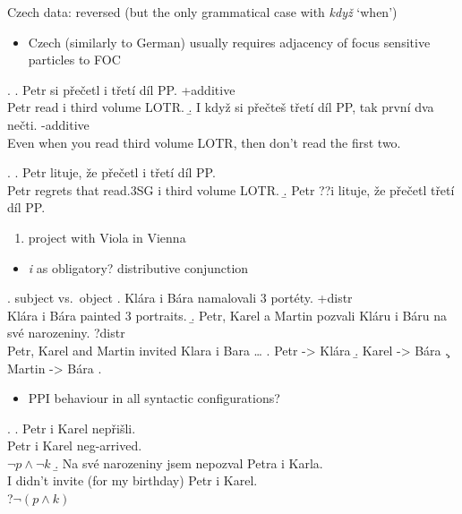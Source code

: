 \documentclass[ignorenonframetext,]{beamer}
\providecommand{\tightlist}{%
  \setlength{\itemsep}{0pt}\setlength{\parskip}{0pt}}
\begin{document}
\begin{frame}

Czech data: reversed (but the only grammatical case with \emph{když}
`when')

\begin{itemize}
\tightlist
\item
  Czech (similarly to German) usually requires adjacency of focus
  sensitive particles to FOC
\end{itemize}

\ex. \a. Petr si přečetl i třetí díl PP. \hfill +additive\\
Petr read i third volume LOTR. \b. I když si přečteš třetí díl PP, tak
první dva nečti. \hfill -additive\\
Even when you read third volume LOTR, then don't read the first two.

\ex. \a. Petr lituje, že přečetl i třetí díl PP.\\
Petr regrets that read.3SG i third volume LOTR. \b. Petr ??i lituje, že
přečetl třetí díl PP.

\end{frame}

\begin{frame}

\begin{enumerate}
\def\labelenumi{\arabic{enumi})}
\setcounter{enumi}{2}
\tightlist
\item
  project with Viola in Vienna
\end{enumerate}

\begin{itemize}
\tightlist
\item
  \emph{i} as obligatory? distributive conjunction
\end{itemize}

\ex. subject vs.~object \a. Klára i Bára namalovali 3 portéty.
\hfill +distr\\
Klára i Bára painted 3 portraits. \b. Petr, Karel a Martin pozvali Kláru
i Báru na své narozeniny. \hfill ?distr\\
Petr, Karel and Martin invited Klara i Bara \ldots{} \a. Petr
-\textgreater{} Klára \b. Karel -\textgreater{} Bára \c. Martin
-\textgreater{} Bára \z.

\end{frame}

\begin{frame}

\begin{itemize}
\tightlist
\item
  PPI behaviour in all syntactic configurations?
\end{itemize}

\ex. \a. Petr i Karel nepřišli.\\
Petr i Karel neg-arrived.\\
\(\neg p \wedge \neg k\) \b. Na své narozeniny jsem nepozval Petra i
Karla.\\
I didn't invite (for my birthday) Petr i Karel.\\
?\(\neg(p \wedge k)\)

\end{frame}
\end{document}

